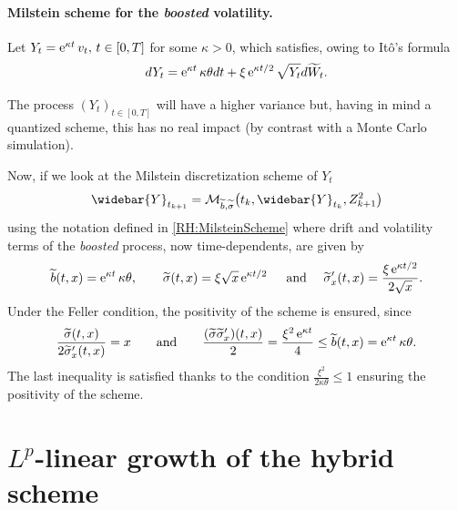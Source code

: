 \paragraph{Milstein scheme for the \textit{boosted} volatility.}
Let $Y_t = \operatorname{e}^{\kappa t} v_t, \, t \in [0,T]$ for some $\kappa > 0$, which satisfies, owing to Itô's formula
\begin{equation*}
	d Y_t = \operatorname{e}^{\kappa t} \kappa \theta dt + \xi \operatorname{e}^{\kappa t / 2} \sqrt{Y_t} d \widetilde W_t.
\end{equation*}

\begin{remark}
	The process $(Y_t)_{t \in [0,T]}$ will have a higher variance but, having in mind a quantized scheme, this has no real impact (by contrast with a Monte Carlo simulation).
\end{remark}

Now, if we look at the Milstein discretization scheme of $Y_t$
\begin{equation*}
	\widebar{Y}_{t_{k+1}} = \mathcal{M}_{\widetilde b, \widetilde \sigma} \big( t_k, \widebar{Y}_{t_k}, Z_{k+1}^2 \big)
\end{equation*}
using the notation defined in \eqref{RH:MilsteinScheme} where drift and volatility terms of the \textit{boosted} process, now time-dependents, are given by
\begin{equation*}
	\widetilde b(t,x) = \operatorname{e}^{\kappa t} \kappa \theta, \qquad \widetilde \sigma(t,x) = \xi \sqrt{x} \operatorname{e}^{\kappa t / 2} \quad \textrm{ and } \quad \widetilde \sigma_{x}^{\prime} (t,x) = \frac{\xi \operatorname{e}^{\kappa t / 2}}{2 \sqrt{x}}.
\end{equation*}
Under the Feller condition, the positivity of the scheme is ensured, since
\begin{equation*}
	\frac{\widetilde \sigma(t,x)}{2 \widetilde \sigma_{x}^{\prime} (t,x) } = x \qquad \textrm{and} \qquad \frac{(\widetilde \sigma \widetilde \sigma_{x}^{\prime}) (t,x)}{2} = \frac{ \xi^2 \operatorname{e}^{ \kappa t}}{4} \leq \widetilde b(t,x) = \operatorname{e}^{\kappa t} \kappa \theta.
\end{equation*}
The last inequality is satisfied thanks to the condition $\frac{\xi^2}{2 \kappa \theta} \leq 1$ ensuring the positivity of the scheme.









\section{$L^p$-linear growth of the hybrid scheme}\label{RH:appendix:proofLplineargrowth}

